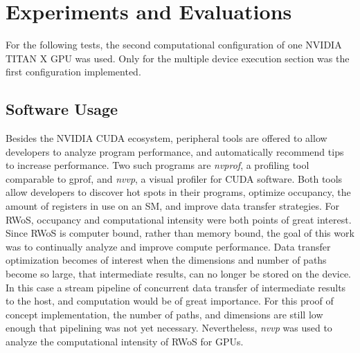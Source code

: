 \chapter{Experiments and Evaluations}
\label{chapter:experiments_and_evaluations}
For the following tests, the second computational configuration of one NVIDIA TITAN X GPU
was used.  Only for the multiple device execution section was the first configuration implemented.
\section{Software Usage}
Besides the NVIDIA CUDA ecosystem, peripheral tools are offered to allow developers
to analyze program performance, and automatically recommend tips to increase performance.
Two such programs are \textit{nvprof}, a profiling tool comparable to gprof, and
\textit{nvvp}, a visual profiler for \Gls{CUDA} software. Both tools allow developers
to discover hot spots in their programs, optimize occupancy, the amount of registers
in use on an SM, and improve data transfer strategies.  For \Gls{RWoS}, occupancy
and computational intensity were both points of great interest. Since \Gls{RWoS}
is computer bound, rather than memory bound, the goal of this work was to continually
analyze and improve compute performance.  Data transfer optimization becomes of interest
when the dimensions and number of paths become so large, that intermediate results,
can no longer be stored on the device.  In this case a stream pipeline of concurrent
data transfer of intermediate results to the host, and computation would be of great
importance.  For this proof of concept implementation, the number of paths, and dimensions
are still low enough that pipelining was not yet necessary.  Nevertheless, \textit{nvvp}
was used to analyze the computational intensity of \Gls{RWoS} for \Glspl{GPU}.
